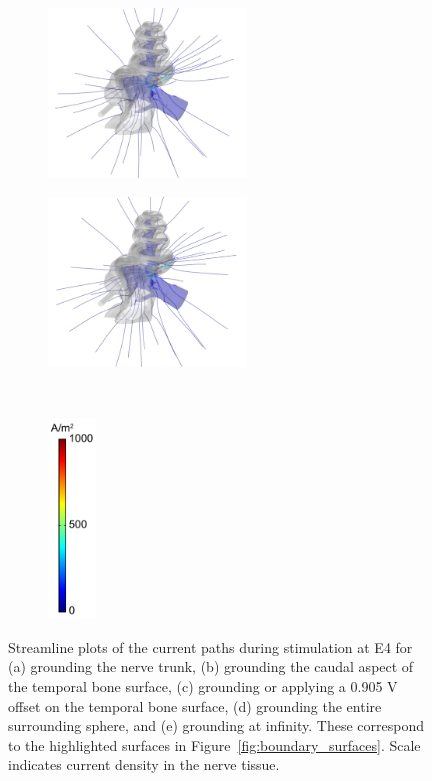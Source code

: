 \begin{figure}
    \begin{subfigure}[t]{0.34\textwidth}
        \centering
        \includegraphics[height=4.5cm]{Validation/streamlines-term4-sph_gnd-bare}
        \caption{}
        \label{fig:valid_streams_sph}
    \end{subfigure}%
    \begin{subfigure}[t]{0.34\textwidth}
        \centering
        \includegraphics[height=4.5cm]{Validation/streamlines-term4-inf_gnd-bare}
        \caption{}
        \label{fig:valid_streams_inf}
    \end{subfigure}%
    ~~%
    \begin{subfigure}[t]{0.09\textwidth}
        \centering
        \includegraphics[height=5.3cm]{Validation/cbar_streamlines_short}
    \end{subfigure}%
    
    \caption[Streamline plots of the current paths during stimulation at
    E4]{Streamline plots of the current paths during stimulation at E4 for (a)
    grounding the nerve trunk, (b) grounding the caudal aspect of the temporal
    bone surface, (c) grounding or applying a 0.905 V offset on the temporal
    bone surface, (d) grounding the entire surrounding sphere, and (e) grounding
    at infinity. These correspond to the highlighted surfaces in
    Figure~\ref{fig:boundary_surfaces}. Scale indicates current density in the
    nerve tissue.}
	\label{fig:valid_streamlines}
\end{figure}

